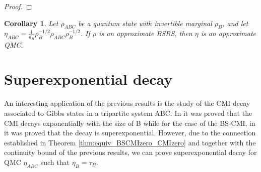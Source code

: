 \documentclass[11pt]{article}
\theoremstyle{newdefinition}
\theoremstyle{newplain}
\newtheorem{corollary}[definition]{Corollary}
\theoremstyle{myplain}
\DeclareMathOperator{\1}{\mathds{1}}
\newcommand{\PCR}[1]{{\color{blue}#1}}
\newcommand{\AC}[1]{{\color{green}#1}}
\begin{document}
{\begin{proof}
\end{proof}


\begin{corollary}
    Let $\rho_{ABC}$ be a quantum state with invertible marginal $\rho_B$, and let $\eta_{ABC}= \frac{1}{d_B} \rho_B^{-1/2} \rho_{ABC}\rho_B^{-1/2} $. If $\rho$ is an approximate BSRS, then $\eta$ is an approximate QMC. 
\end{corollary}





\section{Superexponential decay}

\PCR{An interesting application of the previous results is the study of the CMI decay associated to Gibbs states in a tripartite  system ABC. In \cite{BluhmCapelPerezHernandez-ExpDecayMI-2021} it was proved that the CMI decays exponentially with the size of B while for the case of the BS-CMI, in \cite{gondolf2024conditional} it was proved that the decay is superexponential. However, due to the connection established in Theorem \ref{thm:equiv_BSCMIzero_CMIzero} and together with the continuity bound of the previous results, we can prove superexponential decay for QMC  $\eta_{ABC}$ such that $\eta_B=\tau_B$.

}}
\end{document}
